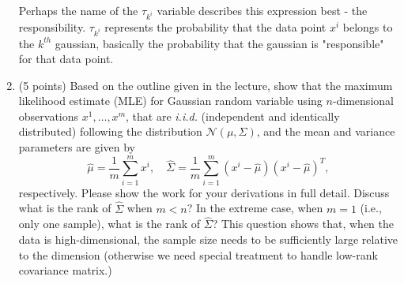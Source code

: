 \documentclass[twoside,12pt]{article}
\begin{document}
\begin{enumerate}[label*=\arabic*.]
Perhaps the name of the $\tau_{k^i}$ variable describes this expression best - the responsibility. $\tau_{k^i}$ represents the probability that the data point $x^i$ belongs to the $k^{th}$ gaussian, basically the probability that the gaussian is "responsible" for that data point.


\item (5 points) Based on the outline given in the lecture, show that the maximum likelihood estimate (MLE) for Gaussian random variable using $n$-dimensional observations $x^1, \ldots, x^m$, that are {\it i.i.d.} (independent and identically distributed) following the distribution $\mathcal N(\mu, \Sigma)$, and the mean and variance parameters are given by 
\[
\hat \mu = \frac 1 m \sum_{i=1}^m x^i, \quad \hat \Sigma = \frac 1 m \sum_{i=1}^m (x^i - \hat \mu)(x^i - \hat \mu)^T,
\]
respectively. Please show the work for your derivations in full detail. Discuss what is the rank of $\hat \Sigma$ when $m<n$? In the extreme case, when $m=1$ (i.e., only one sample), what is the rank of $\hat \Sigma$? This question shows that, when the data is high-dimensional, the sample size needs to be sufficiently large relative to the dimension (otherwise we need special treatment to handle low-rank covariance matrix.)


\end{enumerate}
\end{document}
